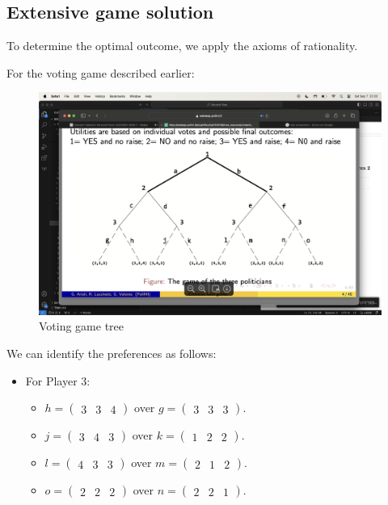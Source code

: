 \subsection{Extensive game solution}
To determine the optimal outcome, we apply the axioms of rationality.
\begin{example}
    For the voting game described earlier:
    \begin{figure}[H]
        \centering
        \includegraphics[width=0.75\linewidth]{images/tree.png}
        \caption{Voting game tree}
    \end{figure}
    We can identify the preferences as follows:
    \begin{itemize}
        \item For Player 3: 
            \begin{itemize}
                \item $h = \begin{pmatrix} 3 & 3 & 4 \end{pmatrix}$ over $g = \begin{pmatrix} 3 & 3 & 3 \end{pmatrix}$.
                \item $j = \begin{pmatrix} 3 & 4 & 3 \end{pmatrix}$ over $k = \begin{pmatrix} 1 & 2 & 2 \end{pmatrix}$.
                \item $l = \begin{pmatrix} 4 & 3 & 3 \end{pmatrix}$ over $m = \begin{pmatrix} 2 & 1 & 2 \end{pmatrix}$.
                \item $o = \begin{pmatrix} 2 & 2 & 2 \end{pmatrix}$ over $n = \begin{pmatrix} 2 & 2 & 1 \end{pmatrix}$.

\end{itemize}
\end{itemize}
\end{example}
